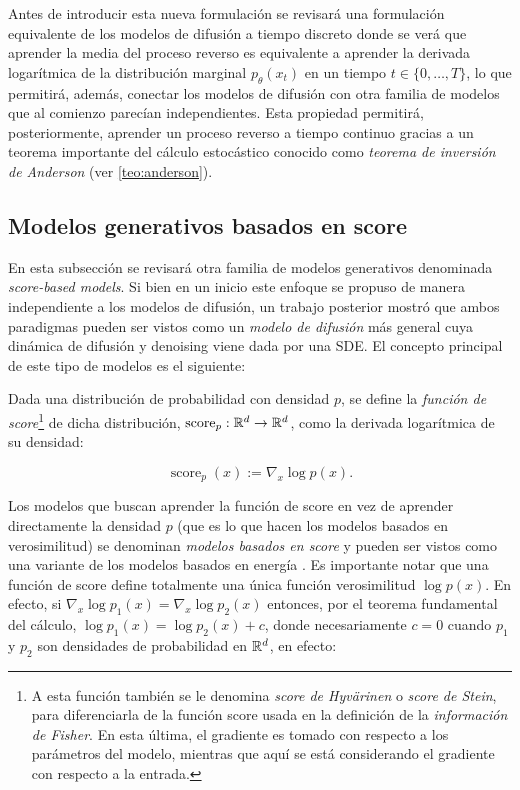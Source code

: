 Antes de introducir esta nueva formulación se revisará una formulación equivalente de los modelos de difusión a tiempo discreto donde se verá que aprender la media del proceso reverso es equivalente a aprender la derivada logarítmica de la distribución marginal $p_\theta(x_t)$ en un tiempo $t\in\{0,\ldots,T\}$, lo que permitirá, además, conectar los modelos de difusión con otra familia de modelos que al comienzo parecían independientes. Esta propiedad permitirá, posteriormente, aprender un proceso reverso a tiempo continuo gracias a un teorema importante del cálculo estocástico conocido como \textit{teorema de inversión de Anderson} (ver \autoref{teo:anderson}).

\subsection{Modelos generativos basados en score}
\label{dm/continuous_dm/score}

En esta subsección se revisará otra familia de modelos generativos denominada \textit{score-based models}. Si bien en un inicio este enfoque se propuso de manera independiente a los modelos de difusión, un trabajo posterior mostró que ambos paradigmas pueden ser vistos como un \textit{modelo de difusión} más general cuya dinámica de difusión y denoising viene dada por una SDE. El concepto principal de este tipo de modelos es el siguiente:

\begin{defn}
    \label{defn:score}
    Dada una distribución de probabilidad con densidad $p$, se define la \textit{función de score}\footnote{A esta función también se le denomina \textit{score de Hyvärinen} o \textit{score de Stein}, para diferenciarla de la función score usada en la definición de la \textit{información de Fisher}. En esta última, el gradiente es tomado con respecto a los parámetros del modelo, mientras que aquí se está considerando el gradiente con respecto a la entrada.} de dicha distribución, $\operatorname{score}_p:\mathbb{R}^d\to\mathbb{R}^d$, como la derivada logarítmica de su densidad:

    \begin{equation*}
        \operatorname{score}_p(x) := \nabla_x \log p(x).
    \end{equation*}
\end{defn}

Los modelos que buscan aprender la función de score en vez de aprender directamente la densidad $p$ (que es lo que hacen los modelos basados en verosimilitud) se denominan \textit{modelos basados en score} y pueden ser vistos como una variante de los modelos basados en energía \cite{song2021trainenergybasedmodels}. Es importante notar que una función de score define totalmente una única función verosimilitud $\log p(x)$. En efecto, si $\nabla_x \log p_1(x) = \nabla_x \log p_2(x)$ entonces, por el teorema fundamental del cálculo, $\log p_1(x) = \log p_2(x)+c$, donde necesariamente $c=0$ cuando $p_1$ y $p_2$ son densidades de probabilidad en $\mathbb{R}^d$, en efecto:

